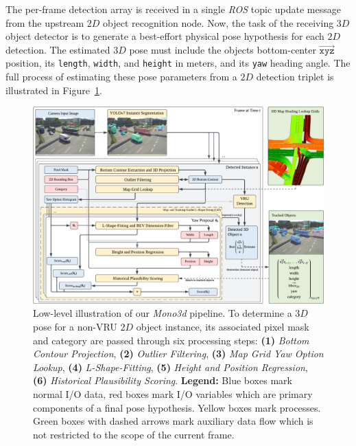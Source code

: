 The per-frame detection array is received in a single \textit{ROS} topic update message from the upstream $2D$ object recognition node.
Now, the task of the receiving $3D$ object detector is to generate a best-effort physical pose hypothesis for each $2D$ detection.
The estimated $3D$ pose must include the objects bottom-center $\overrightarrow{\mathtt{xyz}}$ position, its \texttt{length}, \texttt{width}, and \texttt{height} in meters, and its \texttt{yaw} heading angle.
The full process of estimating these pose parameters from a $2D$ detection triplet is illustrated in Figure~\ref{fig:mono3d-lowlevel}.

\begin{figure}[htb]
    \centering
    \includegraphics[width=\linewidth]{figures/mono3d-pipeline-lowelevel}
    \caption{Low-level illustration of our \textit{Mono3d} pipeline. To determine a $3D$ pose for a non-VRU $2D$ object instance, its associated pixel mask and category are passed through six processing steps: \textbf{(1)} \textit{Bottom Contour Projection}, \textbf{(2)} \textit{Outlier Filtering}, \textbf{(3)} \textit{Map Grid Yaw Option Lookup}, \textbf{(4)} \textit{L-Shape-Fitting}, \textbf{(5)} \textit{Height and Position Regression}, \textbf{(6)} \textit{Historical Plausibility Scoring}. \textbf{Legend:} Blue boxes mark normal I/O data, red boxes mark I/O variables which are primary components of a final pose hypothesis. Yellow boxes mark processes. Green boxes with dashed arrows mark auxiliary data flow which is not restricted to the scope of the current frame.}
    \label{fig:mono3d-lowlevel}
\end{figure}


